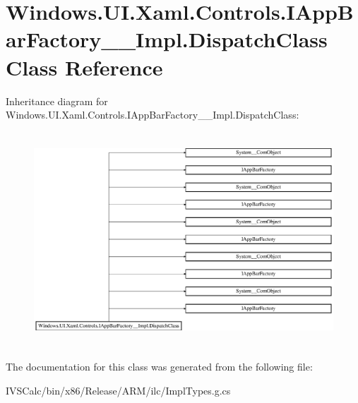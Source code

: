 \hypertarget{class_windows_1_1_u_i_1_1_xaml_1_1_controls_1_1_i_app_bar_factory_____impl_1_1_dispatch_class}{}\section{Windows.\+U\+I.\+Xaml.\+Controls.\+I\+App\+Bar\+Factory\+\_\+\+\_\+\+Impl.\+Dispatch\+Class Class Reference}
\label{class_windows_1_1_u_i_1_1_xaml_1_1_controls_1_1_i_app_bar_factory_____impl_1_1_dispatch_class}
Inheritance diagram for Windows.\+U\+I.\+Xaml.\+Controls.\+I\+App\+Bar\+Factory\+\_\+\+\_\+\+Impl.\+Dispatch\+Class\+:\begin{figure}[H]
\begin{center}
\leavevmode
\includegraphics[height=8.062827cm]{class_windows_1_1_u_i_1_1_xaml_1_1_controls_1_1_i_app_bar_factory_____impl_1_1_dispatch_class}
\end{center}
\end{figure}


The documentation for this class was generated from the following file\+:\begin{DoxyCompactItemize}
\item 
I\+V\+S\+Calc/bin/x86/\+Release/\+A\+R\+M/ilc/Impl\+Types.\+g.\+cs\end{DoxyCompactItemize}
